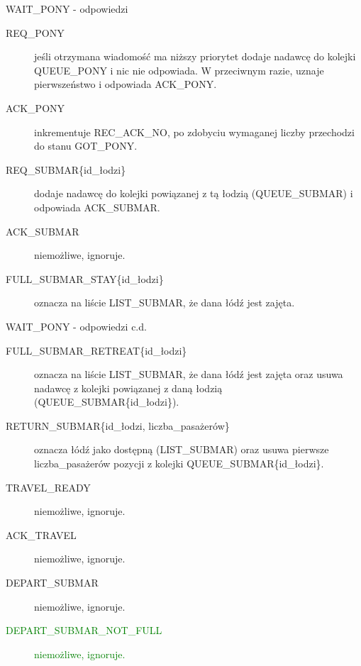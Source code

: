 \documentclass{beamer}
\begin{document}
\begin{frame}{WAIT\_PONY - odpowiedzi}
    \internallinenumbers
    \resetlinenumber[1]
    \begin{description}
        \item [REQ\_PONY] jeśli otrzymana wiadomość ma niższy priorytet dodaje nadawcę do kolejki QUEUE\_PONY i nic nie odpowiada. W przeciwnym razie, uznaje pierwszeństwo i odpowiada ACK\_PONY.
        \item [ACK\_PONY] inkrementuje REC\_ACK\_NO, po zdobyciu wymaganej liczby przechodzi do stanu GOT\_PONY.
        \item [REQ\_SUBMAR\{id\_łodzi\}] dodaje nadawcę do kolejki powiązanej z tą łodzią (QUEUE\_SUBMAR) i odpowiada ACK\_SUBMAR.
        \item [ACK\_SUBMAR] niemożliwe, ignoruje.
        \item [FULL\_SUBMAR\_STAY\{id\_łodzi\}] oznacza na liście LIST\_SUBMAR, że dana łódź jest zajęta.

    \end{description}
\end{frame}

\begin{frame}{WAIT\_PONY - odpowiedzi c.d.}
    \internallinenumbers
    \resetlinenumber[1]
    \begin{description}
        \item [FULL\_SUBMAR\_RETREAT\{id\_łodzi\}] oznacza na liście LIST\_SUBMAR, że dana łódź jest zajęta oraz usuwa nadawcę z kolejki powiązanej z daną łodzią (QUEUE\_SUBMAR\{id\_łodzi\}).
        \item [RETURN\_SUBMAR\{id\_łodzi, liczba\_pasażerów\}] oznacza łódź jako dostępną (LIST\_SUBMAR) oraz usuwa pierwsze liczba\_pasażerów pozycji z kolejki QUEUE\_SUBMAR\{id\_łodzi\}.
        \item [TRAVEL\_READY] niemożliwe, ignoruje.
        \item [ACK\_TRAVEL] niemożliwe, ignoruje.
        \item [DEPART\_SUBMAR] niemożliwe, ignoruje.
        \item [\textcolor{green}{DEPART\_SUBMAR\_NOT\_FULL}] \textcolor{green}{niemożliwe, ignoruje.}
    \end{description}
\end{frame}
\end{document}
